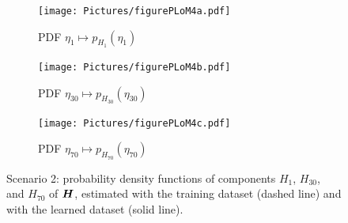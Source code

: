 \begin{figure}[!htb]
    \begin{center}
        \begin{subfigure}[b]{0.32\textwidth}
            \begin{center}
                \texttt{[image: Pictures/figurePLoM4a.pdf]}
            \end{center}
                \caption{PDF $\eta_1\mapsto p_{H_1}(\eta_1)$}
                \label{fig:figurePLoM4a}
            \end{subfigure}
            \begin{subfigure}[b]{0.32\textwidth}
                \begin{center}
                    \texttt{[image: Pictures/figurePLoM4b.pdf]}
                \end{center}
                \caption{PDF $\eta_{30}\mapsto p_{H_{30}}(\eta_{30})$}
                \label{fig:figurePLoM4b}
            \end{subfigure}
            \begin{subfigure}[b]{0.32\textwidth}
                \begin{center}
                    \texttt{[image: Pictures/figurePLoM4c.pdf]}
                \end{center}    
                \caption{PDF $\eta_{70}\mapsto p_{H_{70}}(\eta_{70})$}
                \label{fig:figurePLoM4c}
            \end{subfigure}
    \end{center}
    \caption[Scenario 2: probability density functions of components $H_1$, $H_{30}$, and $H_{70}$ of $\bfH$.]{Scenario 2: probability density functions of components $H_1$, $H_{30}$, and $H_{70}$ of $\bfH$, estimated with the training dataset (dashed line) and with the learned dataset (solid line).}
    \label{fig:figurePLoM4}
\end{figure}
%
